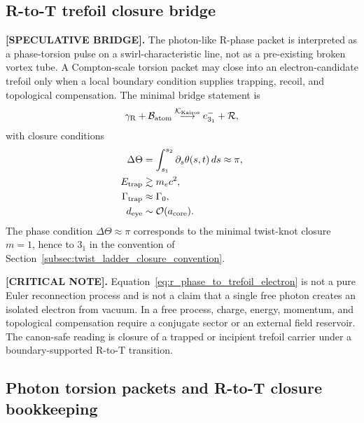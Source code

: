 
    \subsection{R-to-T trefoil closure bridge}
        \label{subsec:rt_trefoil_closure_bridge}

        \textbf{[SPECULATIVE BRIDGE].}
        The photon-like R-phase packet is interpreted as a phase-torsion pulse
        on a swirl-characteristic line, not as a pre-existing broken vortex tube.
        A Compton-scale torsion packet may close into an electron-candidate
        trefoil only when a local boundary condition supplies trapping, recoil,
        and topological compensation. The minimal bridge statement is
        \begin{align}
            \gamma_{\rm R}
            +
            \mathcal{B}_{\rm atom}
            \overset{\mathcal{K}_{\rm Kairos}}{\longrightarrow}
            e^-_{3_1}
            +
            \mathcal{R},
            \label{eq:r_phase_to_trefoil_electron}
        \end{align}
        with closure conditions
        \begin{align}
            \Delta\Theta
            &=
            \int_{s_1}^{s_2}\partial_s\theta(s,t)\,ds
            \approx \pi,\\
            E_{\rm trap} &\gtrsim m_e c^2,\\
            \Gamma_{\rm trap} &\approx \Gamma_0,\\
            d_{\rm eye} &\sim \mathcal{O}(a_{\rm core}).
            \label{eq:trefoil_closure_conditions}
        \end{align}
        The phase condition \(\Delta\Theta\approx\pi\) corresponds to the
        minimal twist-knot closure \(m=1\), hence to \(3_1\) in the convention of
        Section~\ref{subsec:twist_ladder_closure_convention}.

        \textbf{[CRITICAL NOTE].}
        Equation~\eqref{eq:r_phase_to_trefoil_electron} is not a pure Euler
        reconnection process and is not a claim that a single free photon creates
        an isolated electron from vacuum. In a free process, charge, energy,
        momentum, and topological compensation require a conjugate sector or an
        external field reservoir. The canon-safe reading is closure of a trapped
        or incipient trefoil carrier under a boundary-supported R-to-T transition.

    \subsection{Photon torsion packets and R-to-T closure bookkeeping}
        \label{subsec:photon_torsion_r_to_t_closure}

